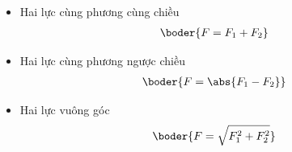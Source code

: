 \begin{itemize}
\item Hai lực cùng phương cùng chiều
\begin{align*}
\boder{F=F_1+F_2}
\end{align*}
\item Hai lực cùng phương ngược chiều
\begin{align*}
\boder{F=\abs{F_1-F_2}}
\end{align*}
\item Hai lực vuông góc
\begin{align*}
\boder{F=\sqrt{F_1^2+F_2^2}}
\end{align*}
\end{itemize}
